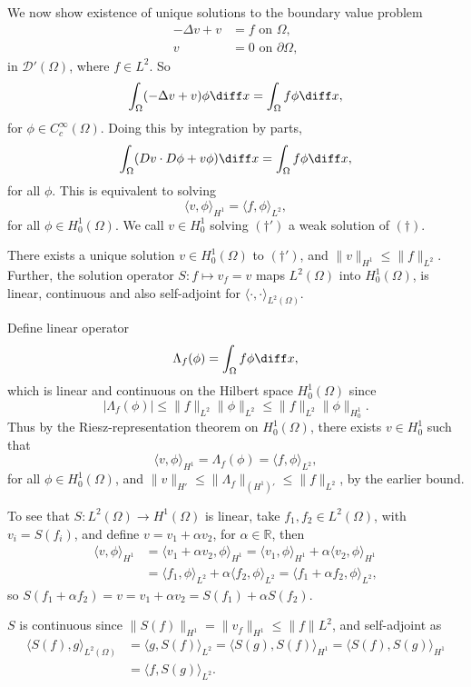 \documentclass[12pt]{article}
\begin{document}
We now show existence of unique solutions to the boundary value problem
\begin{align*}
	- \Delta v + v &= f \text{ on } \Omega, \\
	v &= 0 \text{ on } \partial \Omega,
\end{align*}
in $\mathcal{D}'(\Omega)$, where $f \in L^2$. So
\[
\int_{\Omega}(- \Delta v + v) \phi \diff x = \int_{\Omega} f \phi \diff x,
\]
for $\phi \in C^\infty_c(\Omega)$. Doing this by integration by parts,
\[
\int_{\Omega} (D v \cdot D \phi + v \phi) \diff x = \int_{\Omega} f \phi \diff x,
\]
for all $\phi$.
This is equivalent to solving
\[
	\langle v, \phi\rangle_{H^1} = \langle f, \phi \rangle_{L^2}, \tag{$\dagger'$}
\]
for all $\phi \in H^1_0(\Omega)$. We call $v \in H^1_0$ solving $(\dagger')$ a weak solution of $(\dagger)$.

\begin{theorem}
	There exists a unique solution $v \in H^1_0(\Omega)$ to $(\dagger')$, and $\|v\|_{H^1} \leq \|f\|_{L^2}$. Further, the solution operator $S : f \mapsto v_f = v$ maps $L^2(\Omega)$ into $H^1_0(\Omega)$, is linear, continuous and also self-adjoint for $\langle \cdot, \cdot \rangle_{L^2(\Omega)}$.
\end{theorem}

\begin{proofbox}
	Define linear operator
	\[
	\Lambda_f(\phi) = \int_{\Omega} f \phi \diff x,
	\]
	which is linear and continuous on the Hilbert space $H^1_0(\Omega)$ since
	\[
	|\Lambda_f(\phi)| \leq \|f\|_{L^2} \|\phi\|_{L^2} \leq \|f\|_{L^2} \|\phi\|_{H^1_0}.
	\]
	Thus by the Riesz-representation theorem on $H^1_0(\Omega)$, there exists $v \in H^1_0$ such that
	\[
	\langle v, \phi \rangle_{H^1} = \Lambda_f (\phi) = \langle f, \phi \rangle_{L^2},
	\]
	for all $\phi \in H^1_0(\Omega)$, and $\|v\|_{H'} \leq \|\Lambda_f\|_{(H^1)'} \leq \|f\|_{L^2}$, by the earlier bound.

	To see that $S : L^2(\Omega) \to H^1(\Omega)$ is linear, take $f_1, f_2 \in L^2(\Omega)$, with $v_i = S(f_i)$, and define $v = v_1 + \alpha v_2$, for $\alpha \in \mathbb{R}$, then
	\begin{align*}
		\langle v, \phi \rangle_{H^1} &= \langle v_1 + \alpha v_2, \phi \rangle_{H^1} = \langle v_1, \phi \rangle_{H^1} + \alpha \langle v_2, \phi \rangle_{H^1} \\
					      &= \langle f_1, \phi \rangle_{L^2} + \alpha \langle f_2, \phi \rangle_{L^2} = \langle f_1 + \alpha f_2, \phi \rangle_{L^2},
	\end{align*}
	so $S(f_1 + \alpha f_2) = v = v_1 + \alpha v_2 = S(f_1) + \alpha S(f_2)$.

	$S$ is continuous since $\|S(f)\|_{H^1} = \|v_f\|_{H^1} \leq \|f\|L^2$, and self-adjoint as
	\begin{align*}
		\langle S(f), g \rangle_{L^2(\Omega)} &= \langle g, S(f) \rangle_{L^2} = \langle S(g), S(f) \rangle_{H^1} = \langle S(f), S(g) \rangle_{H^1} \\
						      &= \langle f, S(g) \rangle_{L^2}.
	\end{align*}
\end{proofbox}
\end{document}
